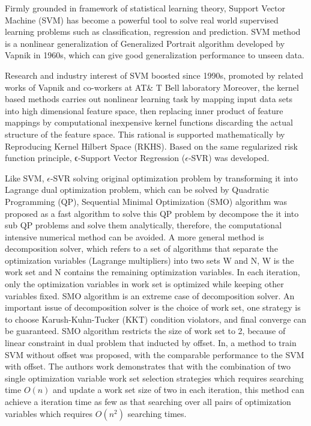\documentclass[12pt, draftclsnofoot, onecolumn]{IEEEtran}
\begin{document}
\begin{spacing}{2}
Firmly grounded in framework of statistical learning theory, Support Vector Machine (SVM) has become a powerful tool to solve real world supervised learning problems such as classification, regression and prediction. SVM method is a nonlinear generalization of Generalized Portrait algorithm developed by Vapnik in 1960s\cite{vapnik1963pattern}\cite{vapnik1964note}, which can give good generalization performance to unseen data\cite{scholkopf2002learning}.

Research and industry interest of SVM boosted since 1990s, promoted by related works of Vapnik and co-workers at AT\& T Bell laboratory\cite{boser1992training}\cite{guyon1993automatic}\cite{vapnik2013nature}\cite{cortes1995support}\cite{scholkopf1996incorporating}\cite{vapnik1996support}
Moreover, the kernel based methods\cite{scholkopf2002learning} carries out nonlinear learning task by mapping input data sets into high dimensional feature space, then replacing inner product of feature mappings by computational inexpensive kernel functions discarding the actual structure of the feature space. This rational is supported mathematically by Reproducing Kernel Hilbert Space (RKHS). 
Based on the same regularized risk function principle, ϵ-Support Vector Regression ($\epsilon$-SVR) was developed\cite{vapnik2013nature}\cite{smola2004tutorial}.

Like SVM, $\epsilon$-SVR solving original optimization problem by transforming it into Lagrange dual optimization problem, which can be solved by Quadratic Programming (QP), Sequential Minimal Optimization (SMO) algorithm was proposed as a fast algorithm to solve this QP problem by decompose the it into sub QP problems and solve them analytically\cite{platt1999fast}, therefore, the computational intensive numerical method can be avoided. A more general method is decomposition solver, which refers to a set of algorithms that separate the optimization variables (Lagrange multipliers) into two sets W and N, W is the work set and N contains the remaining optimization variables. In each iteration, only the optimization variables in work set is optimized while keeping other variables fixed. SMO algorithm is an extreme case of decomposition solver. An important issue of decomposition solver is the choice of work set, one strategy is to choose Karush-Kuhn-Tucker (KKT) condition violators, and final converge can be guaranteed\cite{osuna1997improved}. SMO algorithm restricts the size of work set to 2, because of linear constraint in dual problem that inducted by offset. In\cite{steinwart2011training}, a method to train SVM without offset was proposed, with the comparable performance to the SVM with offset. The authors work demonstrates that with the combination of two single optimization variable work set selection strategies which requires searching time $O(n)$ and update a work set size of two in each iteration, this method can achieve a iteration time as few as that searching over all pairs of optimization variables which requires $O(n^{2})$ searching times.


\end{spacing}
\end{document}
